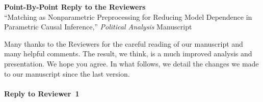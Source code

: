 \documentclass[11pt]{article}
\begin{document}

\begin{center}
  {\bf \Large Point-By-Point Reply to the Reviewers}\\
  ``Matching as Nonparametric Preprocessing for Reducing Model
  Dependence in Parametric Causal Inference,'' {\it Political
  Analysis} Manuscript
\end{center}

Many thanks to the Reviewers for the careful reading of our manuscript
and many helpful comments.  The result, we think, is a much improved
analysis and presentation.  We hope you agree.  In what follows, we
detail the changes we made to our manuscript since the last version.

\paragraph{Reply to Reviewer~1}
\end{document}
